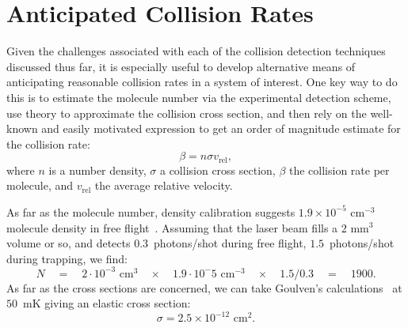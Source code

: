 \section{Anticipated Collision Rates}

Given the challenges associated with each of the collision detection techniques discussed thus far, it is especially useful to develop alternative means of anticipating reasonable collision rates in a system of interest.
One key way to do this is to estimate the molecule number via the experimental detection scheme, use theory to approximate the collision cross section, and then rely on the well-known and easily motivated expression to get an order of magnitude estimate for the collision rate:
\begin{equation}
\beta = n\sigma v_\text{rel},\label{eqsigmant}
\end{equation}
where $n$ is a number density, $\sigma$ a collision cross section, $\beta$ the collision rate per molecule, and $v_\text{rel}$ the average relative velocity.

As far as the molecule number, density calibration suggests $1.9\times10^{-5}\text{ cm}^{-3}$ molecule density in free flight~\citep[Sec.~4.6]{WuThesis2019}. Assuming that the laser beam fills a $2\text{ mm}^3$ volume or so, and detects $0.3$~photons/shot during free flight, $1.5$~photons/shot during trapping, we find:
\begin{equation}
N \quad = \quad 2\cdot10^{-3}\text{ cm}^3\quad\times\quad 1.9\cdot10^-5\text{ cm}^{-3}\quad\times\quad 1.5/0.3 \quad=\quad 1900.
\end{equation}
As far as the cross sections are concerned, we can take Goulven's calculations~\citep[Inset of Fig.~1b]{Stuhl2012evap} at $50$~mK giving an elastic cross section: 
\begin{equation}
\sigma = 2.5\times10^{-12}\text{ cm}^2.
\end{equation}

